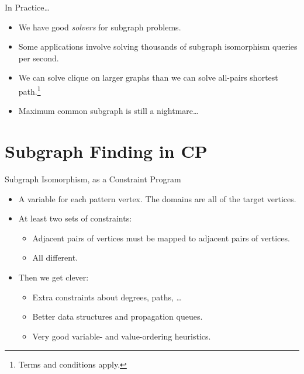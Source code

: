 \documentclass{beamer}
\begin{document}
\begin{frame}{In Practice\ldots}
    \begin{itemize}
        \item We have good \emph{solvers} for subgraph problems.
        \item Some applications involve solving thousands of subgraph isomorphism queries per second.
        \item We can solve clique on larger graphs than we can solve all-pairs
            shortest path.\footnote{Terms and conditions apply.}
        \item<2-> Maximum common subgraph is still a nightmare\ldots
    \end{itemize}
\end{frame}

\section{Subgraph Finding in CP}

\begin{frame}{Subgraph Isomorphism, as a Constraint Program}
    \begin{itemize}
        \item A variable for each pattern vertex. The domains are all of the target vertices.
        \item At least two sets of constraints:
            \begin{itemize}
                \item Adjacent pairs of vertices must be mapped to adjacent pairs of vertices.
                \item All different.
            \end{itemize}
        \item Then we get clever:
            \begin{itemize}
                \item Extra constraints about degrees, paths, \ldots
                \item Better data structures and propagation queues.
                \item Very good variable- and value-ordering heuristics.
            \end{itemize}
    \end{itemize}
\end{frame}
\end{document}
